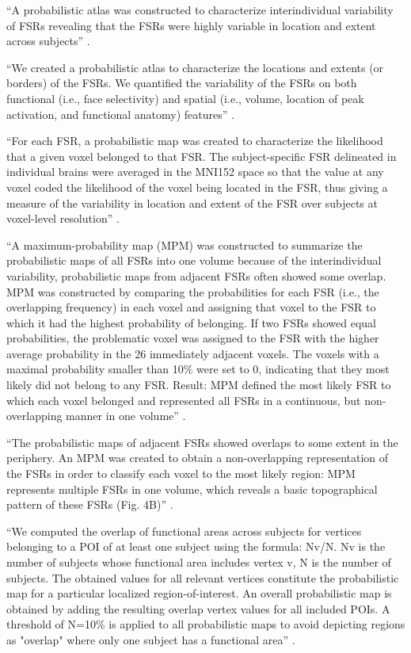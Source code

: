 ``A probabilistic atlas was constructed to characterize interindividual
variability of FSRs revealing that the FSRs were highly variable in location and
extent across subjects'' \citep{zhen2015quantifying}.

``We created a probabilistic atlas to characterize the locations and extents (or
borders) of the FSRs.
%
We quantified the variability of the FSRs on both functional (i.e., face
selectivity) and spatial (i.e., volume, location of peak activation, and
functional anatomy) features'' \citep{zhen2015quantifying}.

``For each FSR, a probabilistic map was created to characterize the likelihood
that a given voxel belonged to that FSR.
%
The subject-specific FSR delineated in individual brains were averaged in the
MNI152 space so that the value at any voxel coded the likelihood of the voxel
being located in the FSR, thus giving a measure of the variability in location
and extent of the FSR over subjects at voxel-level resolution''
\citep{zhen2015quantifying}.



``A maximum-probability map (MPM) was constructed to summarize the probabilistic
maps of all FSRs into one volume because of the interindividual variability,
probabilistic maps from adjacent FSRs often showed some overlap.
%
MPM was constructed by comparing the probabilities for each FSR (i.e., the
overlapping frequency) in each voxel and assigning that voxel to the FSR to
which it had the highest probability of belonging.
%
If two FSRs showed equal probabilities, the problematic voxel was assigned to
the FSR with the higher average probability in the 26 immediately adjacent
voxels.
%
The voxels with a maximal probability smaller than 10\% were set to 0,
indicating that they most likely did not belong to any FSR.
%
Result: MPM defined the most likely FSR to which each voxel belonged and
represented all FSRs in a continuous, but non-overlapping manner in one
volume'' \citep{zhen2015quantifying}.


``The probabilistic maps of adjacent FSRs showed overlaps to some extent in the
periphery.
%
An MPM was created to obtain a non-overlapping representation of the FSRs in
order to classify each voxel to the most likely region:
%
MPM represents multiple FSRs in one volume, which reveals a basic topographical
pattern of these FSRs (Fig. 4B)'' \citet{zhen2015quantifying}.



``We computed the overlap of functional areas across subjects for vertices
belonging to a POI of at least one subject using the formula: Nv/N.
%
Nv is the number of subjects whose functional area includes vertex v,
%
N is the number of subjects.
%
The obtained values for all relevant vertices constitute the probabilistic map
for a particular localized region-of-interest.
%
An overall probabilistic map is obtained by adding the resulting overlap vertex
values for all included POIs.
%
A threshold of N=10\% is applied to all probabilistic maps to avoid depicting
regions as "overlap" where only one subject has a functional area''
\citep{frost2012measuring}.



